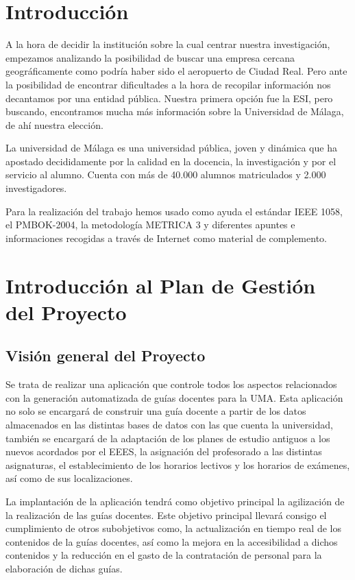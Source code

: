 \documentclass[11pt,a4paper,spanish,twoside]{report}
\begin{document}
\tableofcontents

\chapter*{Introducción}

A la hora de decidir la institución sobre la cual centrar nuestra 
investigación, empezamos analizando la posibilidad de buscar una empresa 
cercana geográficamente como podría haber sido el aeropuerto de Ciudad Real. 
Pero ante la posibilidad de encontrar dificultades a la hora de recopilar 
información nos decantamos por una entidad pública. Nuestra primera opción fue 
la ESI, pero buscando, encontramos mucha más información sobre la Universidad 
de Málaga, de ahí nuestra elección.

La universidad de Málaga es una universidad pública, joven y dinámica que ha 
apostado decididamente por la calidad en la docencia, la investigación y por el
servicio al alumno. Cuenta con más de 40.000 alumnos matriculados y 2.000 
investigadores. 

Para la realización del trabajo hemos usado como ayuda el estándar IEEE 1058, 
el PMBOK-2004, la metodología METRICA 3 y diferentes apuntes e informaciones 
recogidas a través de Internet como material de complemento.

\chapter{Introducción al Plan de Gestión del Proyecto}
\section{Visión general del Proyecto}
Se trata de realizar una aplicación que controle todos los aspectos 
relacionados con la generación automatizada de guías docentes para la UMA.
Esta aplicación no solo se encargará de construir una guía docente a partir de 
los datos almacenados en las distintas bases de datos con las que cuenta la 
universidad, también se encargará de la adaptación de los planes de estudio 
antiguos a los nuevos acordados por el EEES, la asignación del profesorado a 
las distintas asignaturas, el establecimiento de los horarios lectivos y los 
horarios de exámenes, así como de sus localizaciones.

La implantación de la aplicación tendrá como objetivo principal la agilización 
de la realización de las guías docentes. Este objetivo principal llevará 
consigo el cumplimiento de otros subobjetivos como, la actualización en tiempo 
real de los contenidos de la guías docentes, así como la mejora en la 
accesibilidad a dichos contenidos y la reducción en el gasto de la 
contratación de personal para la elaboración de dichas guías.
\end{document}
